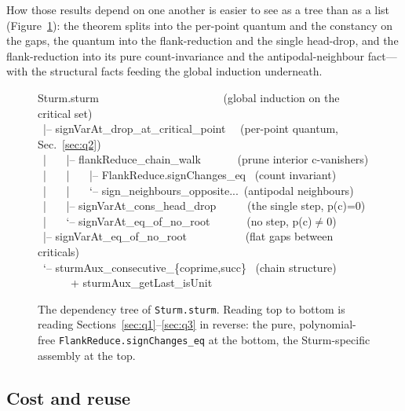 \documentclass[11pt]{article}
\newcommand{\lean}[1]{\texttt{#1}}
\begin{document}
How those results depend on one another is easier to see as a tree than as a list
(Figure~\ref{fig:deptree}): the theorem splits into the per-point quantum and the constancy on the
gaps, the quantum into the flank-reduction and the single head-drop, and the flank-reduction into
its pure count-invariance and the antipodal-neighbour fact---with the structural facts feeding the
global induction underneath.

\begin{figure}[h]
\centering
\begin{tcolorbox}[colframe=ggteal,colback=ggband!18,arc=2pt,boxrule=0.7pt,left=8pt,right=8pt,
  top=5pt,bottom=5pt,width=\textwidth]
\ttfamily\footnotesize
Sturm.sturm \ \ \ \ \ \ \ \ \ \ \ \ \ \ \ \ \ \ \ \ \ \ (global induction on the critical set)\\
\ |-- signVarAt\_drop\_at\_critical\_point \ \ (per-point quantum, Sec.~\ref{sec:q2})\\
\ | \ \ \ |-- flankReduce\_chain\_walk \ \ \ \ \ \ (prune interior c-vanishers)\\
\ | \ \ \ | \ \ \ |-- FlankReduce.signChanges\_eq \ (count invariant)\\
\ | \ \ \ | \ \ \ `-- sign\_neighbours\_opposite...\ (antipodal neighbours)\\
\ | \ \ \ |-- signVarAt\_cons\_head\_drop \ \ \ \ \ (the single step, p(c)=0)\\
\ | \ \ \ `-- signVarAt\_eq\_of\_no\_root \ \ \ \ \ \ (no step, p(c)$\neq$0)\\
\ |-- signVarAt\_eq\_of\_no\_root \ \ \ \ \ \ \ \ \ \ (flat gaps between criticals)\\
\ `-- sturmAux\_consecutive\_\{coprime,succ\} \ (chain structure)\\
\ \ \ \ \ \ + sturmAux\_getLast\_isUnit
\end{tcolorbox}
\caption{The dependency tree of \lean{Sturm.sturm}. Reading top to bottom is reading
Sections~\ref{sec:q1}--\ref{sec:q3} in reverse: the pure, polynomial-free
\lean{FlankReduce.signChanges\_eq} at the bottom, the Sturm-specific assembly at the top.}
\label{fig:deptree}
\end{figure}

\subsection*{Cost and reuse}
\end{document}
